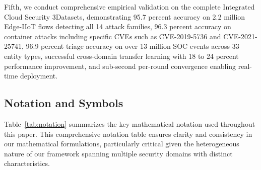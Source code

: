 \documentclass[12pt,a4paper]{article}
\theoremstyle{definition}
\begin{document}
Fifth, we conduct comprehensive empirical validation on the complete Integrated Cloud Security 3Datasets, demonstrating 95.7 percent accuracy on 2.2 million Edge-IIoT flows detecting all 14 attack families, 96.3 percent accuracy on container attacks including specific CVEs such as CVE-2019-5736 and CVE-2021-25741, 96.9 percent triage accuracy on over 13 million SOC events across 33 entity types, successful cross-domain transfer learning with 18 to 24 percent performance improvement, and sub-second per-round convergence enabling real-time deployment.

\subsection{Notation and Symbols}
\label{sec:notation}

Table~\ref{tab:notation} summarizes the key mathematical notation used throughout this paper. This comprehensive notation table ensures clarity and consistency in our mathematical formulations, particularly critical given the heterogeneous nature of our framework spanning multiple security domains with distinct characteristics.
\end{document}
